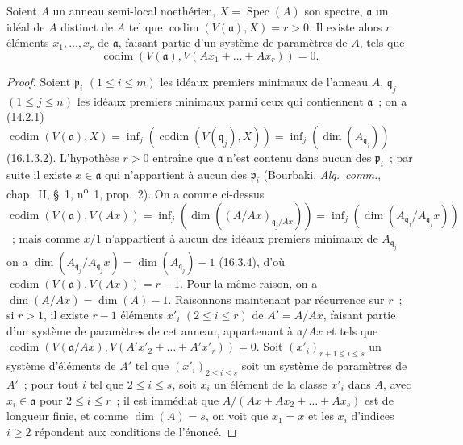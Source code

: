 
\begin{proposition}[16.3.8]
\label{0.16.3.8-fr}
Soient $A$ un anneau semi-local noethérien, $X=\operatorname{Spec}(A)$ son
spectre, $\mathfrak{a}$ un idéal de $A$ distinct de $A$ tel que
$\operatorname{codim}(V(\mathfrak{a}),X)=r>0$. Il existe alors $r$ éléments
$x_1,\ldots,x_r$ de $\mathfrak{a}$, faisant partie d'un système de paramètres
de $A$, tels que
\[
  \operatorname{codim}(V(\mathfrak{a}),
  V(Ax_1+\ldots+Ax_r))=0.
\]
\end{proposition}

\begin{proof}
Soient $\mathfrak{p}_i$ $(1\leq i\leq m)$ les idéaux premiers minimaux de
l'anneau $A$, $\mathfrak{q}_j$ $(1\leq j\leq n)$ les idéaux premiers minimaux
parmi ceux qui contiennent $\mathfrak{a}$~; on a (14.2.1)
$\operatorname{codim}(V(\mathfrak{a}),X)=\inf_j(\operatorname{codim}(V(\mathfrak{q}_j),X))=\inf_j(\dim(A_{\mathfrak{q}_j}))$
(16.1.3.2). L'hypothèse $r>0$ entraîne que $\mathfrak{a}$ n'est contenu dans
aucun des $\mathfrak{p}_i$~; par suite il existe $x\in\mathfrak{a}$ qui
n'appartient à aucun des $\mathfrak{p}_i$ (Bourbaki, \emph{Alg.~comm.},
chap.~II, \S~1, n\textsuperscript{o}~1, prop.~2). On a comme ci-dessus
$\operatorname{codim}(V(\mathfrak{a}),V(Ax))=\inf_j(\dim((A/Ax)_{\mathfrak{q}_j/Ax}))=\inf_j(\dim(A_{\mathfrak{q}_j}/A_{\mathfrak{q}_j}x))$~;
mais comme $x/1$ n'appartient à aucun des idéaux premiers minimaux de
$A_{\mathfrak{q}_j}$ on a
$\dim(A_{\mathfrak{q}_j}/A_{\mathfrak{q}_j}x)
=\dim(A_{\mathfrak{q}_j})-1$ (16.3.4), d'où
$\operatorname{codim}(V(\mathfrak{a}),V(Ax))=r-1$. Pour la même raison, on a
$\dim(A/Ax)=\dim(A)-1$. Raisonnons maintenant par récurrence sur $r$~; si
$r>1$, il existe $r-1$ éléments $x'_i$ $(2\leq i\leq r)$ de $A'=A/Ax$,
faisant partie d'un système de paramètres de cet anneau, appartenant à
$\mathfrak{a}/Ax$ et tels que
$\operatorname{codim}(V(\mathfrak{a}/Ax),V(A'x'_2+\ldots+A'x'_r))=0$.
Soit $(x'_i)_{r+1\leq i\leq s}$ un système d'éléments de $A'$ tel que
$(x'_i)_{2\leq i\leq s}$ soit un système de paramètres de $A'$~; pour tout
$i$ tel que $2\leq i\leq s$, soit $x_i$ un élément de la classe $x'_i$ dans
$A$, avec $x_i\in\mathfrak{a}$ pour $2\leq i\leq r$~; il est immédiat que
$A/(Ax+Ax_2+\ldots+Ax_s)$ est de longueur finie, et comme $\dim(A)=s$, on voit
que $x_1=x$ et les $x_i$ d'indices $i\geq2$ répondent aux conditions de
l'énoncé.
\end{proof}

